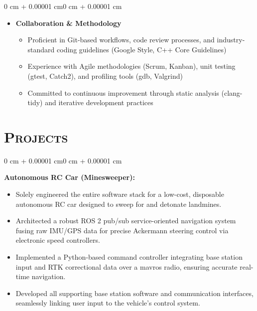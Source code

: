 \documentclass[11pt, letterpaper]{article}
\newenvironment{highlights}{
    \begin{itemize}[
        topsep=0.10 cm,
        parsep=0.10 cm,
        partopsep=0pt,
        itemsep=0pt,
        leftmargin=0.4 cm + 10pt
    ]
}{
    \end{itemize}
}
\newenvironment{onecolentry}{
    \begin{adjustwidth}{0 cm + 0.00001 cm}{0 cm + 0.00001 cm}
}{
    \end{adjustwidth}
}
\begin{document}
\begin{onecolentry}
\begin {itemize}[leftmargin=0.4 cm]
        \item \textbf{Collaboration \& Methodology}
        \begin{itemize}
            \item Proficient in Git-based workflows, code review processes, and industry-standard coding guidelines (Google Style, C++ Core Guidelines)
            \item Experience with Agile methodologies (Scrum, Kanban), unit testing (gtest, Catch2), and profiling tools (gdb, Valgrind)
            \item Committed to continuous improvement through static analysis (clang-tidy) and iterative development practices
        \end{itemize}
    \end{itemize}
\end{onecolentry}

\section{\scshape Projects}

\vspace{0.2 cm}

\begin{onecolentry}
    \textbf{Autonomous RC Car (Minesweeper):}
    \begin{highlights}
        \item Solely engineered the entire software stack for a low-cost, disposable autonomous RC car designed to sweep for and detonate landmines.
        \item Architected a robust ROS 2 pub/sub service-oriented navigation system fusing raw IMU/GPS data for precise Ackermann steering control via electronic speed controllers.
        \item Implemented a Python-based command controller integrating base station input and RTK correctional data over a mavros radio, ensuring accurate real-time navigation.
        \item Developed all supporting base station software and communication interfaces, seamlessly linking user input to the vehicle's control system.
    \end{highlights}
\end{onecolentry}

\vspace{0.4 cm}
\end{document}
